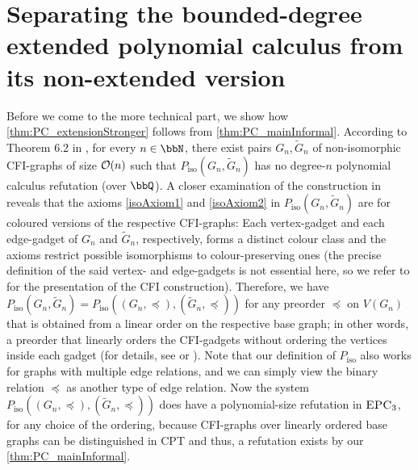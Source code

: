 \documentclass[a4paper,UKenglish,cleveref, autoref, thm-restate]{lipics-v2021}
\newcommand{\EPC}{\mbox{\sc EPC}}
\newcommand{\Oo}{{\cal O}}
\newcommand{\Piso}{P_{\text{iso}}}
\begin{document}
	\section{Separating the bounded-degree extended polynomial calculus from its non-extended version}
	\label{sec:PC_separation}
	Before we come to the more technical part, we show how \autoref{thm:PC_extensionStronger} follows from \autoref{thm:PC_mainInformal}. According to Theorem 6.2 in \cite{berkholz}, for every $n \in \bbN$, there exist pairs $G_n, \widetilde{G}_n$ of non-isomorphic CFI-graphs of size $\Oo(n)$ such that $\Piso(G_n, \widetilde{G}_n)$ has no degree-$n$ polynomial calculus refutation (over $\bbQ$). A closer examination of the construction in \cite{berkholz} reveals that the axioms \eqref{isoAxiom1} and \eqref{isoAxiom2} in $\Piso(G_n, \widetilde{G}_n)$ are for coloured versions of the respective CFI-graphs: Each vertex-gadget and each edge-gadget of $G_n$ and $\widetilde{G}_n$, respectively, forms a distinct colour class and the axioms restrict possible isomorphisms to colour-preserving ones (the precise definition of the said vertex- and edge-gadgets is not essential here, so we refer to \cite{dawar2008} for the presentation of the CFI construction). 
	Therefore, we have $\Piso(G_n, \widetilde{G}_n) = \Piso((G_n, \preceq), (\widetilde{G}_n, \preceq))$ for any preorder $\preceq$ on $V(G_n)$ that is obtained from a linear order on the respective base graph; in other words, a preorder that linearly orders the CFI-gadgets without ordering the vertices inside each gadget (for details, see \cite{caifurimm92} or \cite{dawar2008}). Note that our definition of $\Piso$ also works for graphs with multiple edge relations, and we can simply view the binary relation $\preceq$ as another type of edge relation.
	Now the system $\Piso((G_n, \preceq), (\widetilde{G}_n, \preceq))$ does have a polynomial-size refutation in $\EPC_3$, for any choice of the ordering, because CFI-graphs over linearly ordered base graphs can be distinguished in CPT \cite{dawar2008} and thus, a refutation exists by our \autoref{thm:PC_mainInformal}.
	
\end{document}
